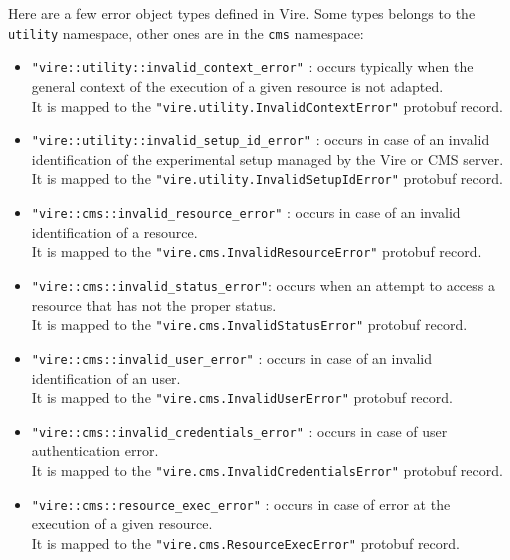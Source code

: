 \noindent
Here are a few error object types defined in Vire.  Some types belongs
to the \texttt{utility} namespace, other  ones are in the \texttt{cms}
namespace:

\begin{itemize}

\item \texttt{"vire::utility::invalid\_context\_error"} : occurs typically when
  the general context of the execution of a given resource is not adapted.\\
  It is mapped to the \texttt{"vire.utility.InvalidContextError"} protobuf record.

\item \texttt{"vire::utility::invalid\_setup\_id\_error"} : occurs in case
  of an invalid identification of the experimental setup managed
  by the Vire or CMS server.\\
  It is mapped to the \texttt{"vire.utility.InvalidSetupIdError"} protobuf record.

\item \texttt{"vire::cms::invalid\_resource\_error"} : occurs in case
  of an invalid identification of a resource.\\
  It is mapped to the  \texttt{"vire.cms.InvalidResourceError"} protobuf record.

\item \texttt{"vire::cms::invalid\_status\_error"}: occurs when an attempt
  to access a resource that has not the proper status.\\
  It is mapped to the  \texttt{"vire.cms.InvalidStatusError"} protobuf record.

\item \texttt{"vire::cms::invalid\_user\_error"} : occurs in case
  of an invalid identification of an user.\\
  It is mapped to the  \texttt{"vire.cms.InvalidUserError"} protobuf record.

\item \texttt{"vire::cms::invalid\_credentials\_error"} : occurs in case
  of user authentication error.\\
  It is mapped to the  \texttt{"vire.cms.InvalidCredentialsError"} protobuf record.

\item \texttt{"vire::cms::resource\_exec\_error"} : occurs in case
  of error at the execution of a given resource.\\
  It is mapped to the  \texttt{"vire.cms.ResourceExecError"} protobuf record.

\end{itemize}




